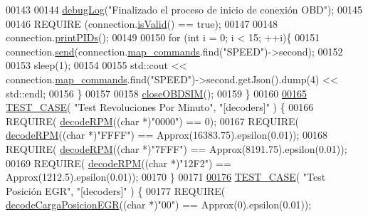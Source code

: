 \begin{DoxyCode}
{{{00143 
00144     \hyperlink{debug_8hpp_a55f41cf7b0585224496de3d7adbc101c}{debugLog}(\textcolor{stringliteral}{"Finalizado el proceso de inicio de conexión OBD"});
00145 
00146     REQUIRE (connection.\hyperlink{classObd_ae28b765bb787467f929eae932133d2aa}{isValid}() == \textcolor{keyword}{true});
00147 
00148     connection.\hyperlink{classObd_abf7e84f45236ea1c78c762ac895c532c}{printPIDs}();
00149 
00150     \textcolor{keywordflow}{for} (\textcolor{keywordtype}{int} i = 0; i < 15; ++i)\{
00151         connection.\hyperlink{classObd_a453591bc9a280e8d44d82025ce8590e9}{send}(connection.\hyperlink{classObd_a8300062d1b651d049cf2a2bc916496cd}{map\_commands}.find(\textcolor{stringliteral}{"SPEED"})->second);
00152 
00153         sleep(1);
00154 
00155         std::cout << connection.\hyperlink{classObd_a8300062d1b651d049cf2a2bc916496cd}{map\_commands}.find(\textcolor{stringliteral}{"SPEED"})->second.getJson().dump(4) << 
      std::endl;
00156     \}
00157 
00158     \hyperlink{UnitTestCase_8cpp_ad24bf860f798931c63aaa488e08b8b4e}{closeOBDSIM}();
00159 \}
00160 
\hyperlink{UnitTestCase_8cpp_aa01bede4cf032808617f744cfdc34e85}{00165} \hyperlink{UnitTestCase_8cpp_ab1b7b485076e7de68cd9912827a8ee86}{TEST\_CASE}( \textcolor{stringliteral}{"Test Revoluciones Por Minuto"}, \textcolor{stringliteral}{"[decoders]"} ) \{
00166     REQUIRE( \hyperlink{decoders_8cpp_a889868c7b1e554aee496e6aed7101cc4}{decodeRPM}((\textcolor{keywordtype}{char} *)\textcolor{stringliteral}{"0000"}) == 0);
00167     REQUIRE( \hyperlink{decoders_8cpp_a889868c7b1e554aee496e6aed7101cc4}{decodeRPM}((\textcolor{keywordtype}{char} *)\textcolor{stringliteral}{"FFFF"}) == Approx(16383.75).epsilon(0.01));
00168     REQUIRE( \hyperlink{decoders_8cpp_a889868c7b1e554aee496e6aed7101cc4}{decodeRPM}((\textcolor{keywordtype}{char} *)\textcolor{stringliteral}{"7FFF"}) == Approx(8191.75).epsilon(0.01));
00169     REQUIRE( \hyperlink{decoders_8cpp_a889868c7b1e554aee496e6aed7101cc4}{decodeRPM}((\textcolor{keywordtype}{char} *)\textcolor{stringliteral}{"12F2"}) == Approx(1212.5).epsilon(0.01));
00170 \}
00171 
\hyperlink{UnitTestCase_8cpp_a6de3b92394355f7de997d66ffda41110}{00176} \hyperlink{UnitTestCase_8cpp_ab1b7b485076e7de68cd9912827a8ee86}{TEST\_CASE}( \textcolor{stringliteral}{"Test Posición EGR"}, \textcolor{stringliteral}{"[decoders]"} ) \{
00177     REQUIRE( \hyperlink{decoders_8cpp_adbe68794075963c37e654d53b8a46f68}{decodeCargaPosicionEGR}((\textcolor{keywordtype}{char} *)\textcolor{stringliteral}{"00"}) == Approx(0).epsilon(0.01));
}}}
\end{DoxyCode}
